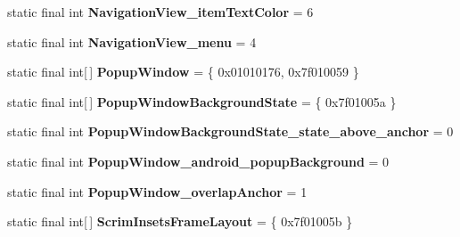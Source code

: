 \begin{DoxyCompactItemize}
\item 
\hypertarget{classandroid_1_1support_1_1design_1_1_r_1_1styleable_a4c70373033dbbc3f671832143e22c0b0}{}static final int {\bfseries Navigation\+View\+\_\+item\+Text\+Color} = 6\label{classandroid_1_1support_1_1design_1_1_r_1_1styleable_a4c70373033dbbc3f671832143e22c0b0}

\item 
\hypertarget{classandroid_1_1support_1_1design_1_1_r_1_1styleable_a028c10ccff368a73e6280a6f7ff22053}{}static final int {\bfseries Navigation\+View\+\_\+menu} = 4\label{classandroid_1_1support_1_1design_1_1_r_1_1styleable_a028c10ccff368a73e6280a6f7ff22053}

\item 
\hypertarget{classandroid_1_1support_1_1design_1_1_r_1_1styleable_aa75bc963c35e5bb705cefe081e851f59}{}static final int\mbox{[}$\,$\mbox{]} {\bfseries Popup\+Window} = \{ 0x01010176, 0x7f010059 \}\label{classandroid_1_1support_1_1design_1_1_r_1_1styleable_aa75bc963c35e5bb705cefe081e851f59}

\item 
\hypertarget{classandroid_1_1support_1_1design_1_1_r_1_1styleable_a0fa0763898706ab0c593a428f940c3e1}{}static final int\mbox{[}$\,$\mbox{]} {\bfseries Popup\+Window\+Background\+State} = \{ 0x7f01005a \}\label{classandroid_1_1support_1_1design_1_1_r_1_1styleable_a0fa0763898706ab0c593a428f940c3e1}

\item 
\hypertarget{classandroid_1_1support_1_1design_1_1_r_1_1styleable_a9653139b89d50df3ffe6fe98aef4c6c2}{}static final int {\bfseries Popup\+Window\+Background\+State\+\_\+state\+\_\+above\+\_\+anchor} = 0\label{classandroid_1_1support_1_1design_1_1_r_1_1styleable_a9653139b89d50df3ffe6fe98aef4c6c2}

\item 
\hypertarget{classandroid_1_1support_1_1design_1_1_r_1_1styleable_ad6a7bb695118202b71eb597719a36bd2}{}static final int {\bfseries Popup\+Window\+\_\+android\+\_\+popup\+Background} = 0\label{classandroid_1_1support_1_1design_1_1_r_1_1styleable_ad6a7bb695118202b71eb597719a36bd2}

\item 
\hypertarget{classandroid_1_1support_1_1design_1_1_r_1_1styleable_afe1e929b18fc439ef8499d628296a0e3}{}static final int {\bfseries Popup\+Window\+\_\+overlap\+Anchor} = 1\label{classandroid_1_1support_1_1design_1_1_r_1_1styleable_afe1e929b18fc439ef8499d628296a0e3}

\item 
\hypertarget{classandroid_1_1support_1_1design_1_1_r_1_1styleable_a95b90e25d1cb72b4321bb1e78f92f75b}{}static final int\mbox{[}$\,$\mbox{]} {\bfseries Scrim\+Insets\+Frame\+Layout} = \{ 0x7f01005b \}\label{classandroid_1_1support_1_1design_1_1_r_1_1styleable_a95b90e25d1cb72b4321bb1e78f92f75b}


\end{DoxyCompactItemize}

